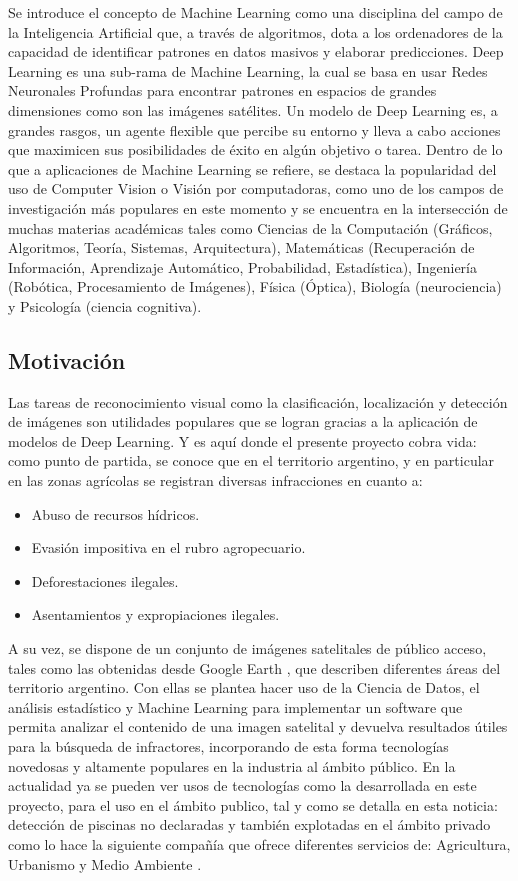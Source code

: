 Se introduce el concepto de Machine Learning como una disciplina del campo de la Inteligencia Artificial que, a través de algoritmos, dota a los ordenadores de la capacidad de identificar patrones en datos masivos y elaborar predicciones. Deep Learning es una sub-rama de Machine Learning, la cual se basa en usar Redes Neuronales Profundas para encontrar patrones en espacios de grandes dimensiones como son las imágenes satélites. Un modelo de Deep Learning es, a grandes rasgos, un agente flexible que percibe su entorno y lleva a cabo acciones que maximicen sus posibilidades de éxito en algún objetivo o tarea. Dentro de lo que a aplicaciones de Machine Learning se refiere, se destaca la popularidad del uso de Computer Vision  o Visión por computadoras, como uno de los campos de investigación más populares en este momento y se encuentra en la intersección de muchas materias académicas tales como Ciencias de la Computación (Gráficos, Algoritmos, Teoría, Sistemas, Arquitectura), Matemáticas (Recuperación de Información, Aprendizaje Automático, Probabilidad, Estadística), Ingeniería (Robótica, Procesamiento de Imágenes), Física (Óptica), Biología (neurociencia) y Psicología (ciencia cognitiva). 
\\

\subsection{Motivación}
Las tareas de reconocimiento visual como la clasificación, localización y detección de imágenes son utilidades populares que se logran gracias a la aplicación de modelos de Deep Learning. Y es aquí donde el presente proyecto cobra vida: como punto de partida, se conoce que en el territorio argentino, y en particular en las zonas agrícolas se registran diversas infracciones en cuanto a:
\begin{itemize}
    \item Abuso de recursos hídricos.
    \item Evasión impositiva en el rubro agropecuario.
    \item Deforestaciones ilegales.
    \item Asentamientos y expropiaciones ilegales.
\end{itemize}
A su vez, se dispone de un conjunto de imágenes satelitales de público acceso, tales como las obtenidas desde Google Earth \cite{google_earth}, que describen diferentes áreas del territorio argentino. Con ellas se plantea hacer uso de la Ciencia de Datos, el análisis estadístico y Machine Learning para implementar un software que permita analizar el contenido de una imagen satelital y devuelva resultados útiles para la búsqueda de infractores, incorporando de esta forma tecnologías novedosas y altamente populares en la industria al ámbito público. En la actualidad ya se pueden ver usos de tecnologías como la desarrollada en este proyecto, para el uso en el ámbito publico, tal y como se detalla en esta noticia: detección de piscinas no declaradas \cite{noticia} y también explotadas en el ámbito privado como lo hace la siguiente compañía que ofrece diferentes servicios de: Agricultura, Urbanismo y Medio Ambiente \cite{kermap}.

